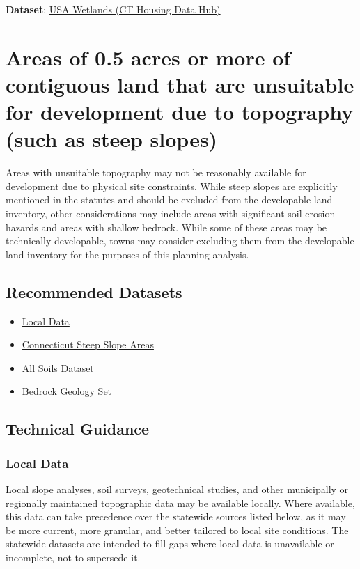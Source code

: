 \documentclass[
  letterpaper,
  DIV=11,
  numbers=noendperiod]{scrreprt}
\providecommand{\tightlist}{%
  \setlength{\itemsep}{0pt}\setlength{\parskip}{0pt}}
\begin{document}
\textbf{Dataset}:
\href{https://housingmaps.ct.gov/maps/9afd2367671f43eaa4cf3972edd32350/about}{USA
Wetlands (CT Housing Data Hub)}

\section{Areas of 0.5 acres or more of contiguous land that are
unsuitable for development due to topography (such as steep
slopes)}\label{areas-of-0.5-acres-or-more-of-contiguous-land-that-are-unsuitable-for-development-due-to-topography-such-as-steep-slopes}

Areas with unsuitable topography may not be reasonably available for
development due to physical site constraints. While steep slopes are
explicitly mentioned in the statutes and should be excluded from the
developable land inventory, other considerations may include areas with
significant soil erosion hazards and areas with shallow bedrock. While
some of these areas may be technically developable, towns may consider
excluding them from the developable land inventory for the purposes of
this planning analysis.

\subsection{Recommended Datasets}\label{recommended-datasets-2}

\begin{itemize}
\tightlist
\item
  \hyperref[sec-local-data-topo]{Local Data}
\item
  \hyperref[sec-connecticut-steep-slope-areas]{Connecticut Steep Slope
  Areas}
\item
  \hyperref[sec-all-soils]{All Soils Dataset}
\item
  \hyperref[sec-bedrock-geology-set]{Bedrock Geology Set}
\end{itemize}

\subsection{Technical Guidance}\label{technical-guidance-3}

\subsubsection{Local Data}\label{sec-local-data-topo}

Local slope analyses, soil surveys, geotechnical studies, and other
municipally or regionally maintained topographic data may be available
locally. Where available, this data can take precedence over the
statewide sources listed below, as it may be more current, more
granular, and better tailored to local site conditions. The statewide
datasets are intended to fill gaps where local data is unavailable or
incomplete, not to supersede it.
\end{document}
